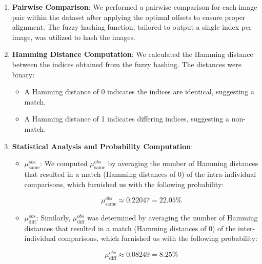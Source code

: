 \begin{enumerate}
    \item \textbf{Pairwise Comparison}: We performed a pairwise comparison for each image pair within the dataset after applying the optimal offsets to ensure proper alignment. The fuzzy hashing function, tailored to output a single index per image, was utilized to hash the images.

    \item \textbf{Hamming Distance Computation}: We calculated the Hamming distance between the indices obtained from the fuzzy hashing. The distances were binary:
    \begin{itemize}
        \item A Hamming distance of 0 indicates the indices are identical, suggesting a match.
        \item A Hamming distance of 1 indicates differing indices, suggesting a non-match.
    \end{itemize} 
    
    \item \textbf{Statistical Analysis and Probability Computation}:
    \begin{itemize}
        \item \textbf{\(\mu_{\text{same}}^{obs}\)}: We computed \(\mu_{\text{same}}^{obs}\) by averaging the number of Hamming distances that resulted in a match (Hamming distances of 0) of the intra-individual comparisons, which furnished us with the following probability:

        \[ \mu_{\text{same}}^{obs} \approx 0.22047 = 22.05\%\]
        
        \item \textbf{\(\mu_{\text{diff}}^{obs}\)}: Similarly, \(\mu_{\text{diff}}^{obs}\) was determined by averaging the number of Hamming distances that resulted in a match (Hamming distances of 0) of the inter-individual comparisons, which furnished us with the following probability:

        \[ \mu_{\text{diff}}^{obs} \approx 0.08249 = 8.25\% \]


\end{itemize}
\end{enumerate}

